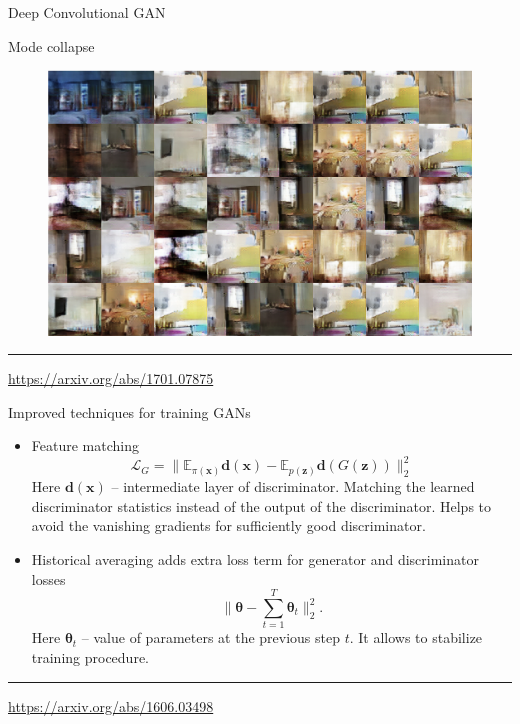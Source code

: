 \documentclass{beamer}
\newcommand{\bx}{\mathbf{x}}
\newcommand{\bz}{\mathbf{z}}
\newcommand{\bbE}{\mathbb{E}}
\newcommand{\cL}{\mathcal{L}}
\newcommand{\btheta}{\boldsymbol{\theta}}
\begin{document}
\begin{frame}{Deep Convolutional GAN}
	\begin{block}{Mode collapse}
		\begin{figure}
			\centering
			\includegraphics[width=0.95\linewidth]{figs/mode_collapse_4}
		\end{figure}
	\end{block}
	\vfill
	\hrule\medskip
	{\scriptsize \href{https://arxiv.org/abs/1701.07875}{https://arxiv.org/abs/1701.07875}}
\end{frame}
\begin{frame}{Improved techniques for training GANs}
	\begin{itemize}
		\item Feature matching
		\[
			\cL_G = \| \bbE_{\pi(\bx)} \mathbf{d}(\bx) - \bbE_{p(\bz)} \mathbf{d}(G(\bz)) \|_2^2
		\]
		Here $\mathbf{d}(\bx)$ -- intermediate layer of discriminator. Matching the learned discriminator statistics instead of the output of the discriminator. Helps to avoid the vanishing gradients for sufficiently good discriminator.
		\item Historical averaging adds extra loss term for generator and discriminator losses
		\vspace{-0.2cm}
		\[
		 \| \btheta - \sum_{t=1}^T \btheta_t\|^2_2.
		\]
		Here $\btheta_t$ -- value of parameters at the previous step $t$. It allows to stabilize training procedure.
	\end{itemize}
	\vfill
	\hrule\medskip
	{\scriptsize \href{https://arxiv.org/abs/1606.03498}{https://arxiv.org/abs/1606.03498}}
\end{frame}
\end{document}
